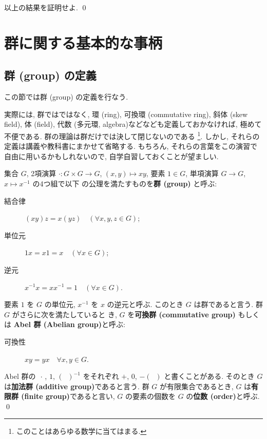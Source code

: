 \documentclass[12pt,twoside]{jarticle}
\begin{document}
\begin{question}
  以上の結果を証明せよ. \qed
\end{question}


\section{群に関する基本的な事柄}
\label{sec:fund-groups}

\subsection{群 (group) の定義}
\label{ss:group-def}

この節では群 (group) の定義を行なう.

実際には, 群ではではなく, 環 (ring), 可換環 (commutative ring), 斜体 (skew
field), 体 (field), 代数 (多元環, algebra)などなども定義しておかなければ, 
極めて不便である. 群の理論は群だけでは決して閉じないのである%
\footnote{このことはあらゆる数学に当てはまる.}.
しかし, それらの定義は講義や教科書にまかせて省略する.
もちろん, それらの言葉をこの演習で自由に用いるかもしれないので, 
自学自習しておくことが望ましい.

\begin{Definition}[群 (group)]
  集合 $G$, 2項演算 $\cdot:G\times G\to G$, $(x,y)\mapsto xy$, 要素 $1\in G$, 
  単項演算 $G\to G$, $x\mapsto x^{-1}$ の4つ組で以下
  の公理を満たすものを{\bf 群 (group)} と呼ぶ:
  \begin{description}
  \item[結合律] $(xy)z = x(yz)\quad (\forall x,y,z\in G)$;
  \item[単位元] $1x = x1 = x\quad (\forall x\in G)$;
  \item[逆元] $x^{-1}x = xx^{-1} = 1\quad (\forall x\in G)$.
  \end{description}
  要素 $1$ を $G$ の単位元, $x^{-1}$ を $x$ の逆元と呼ぶ. 
  このとき $G$ は群であると言う. 群 $G$ がさらに次を満たしていると
  き, $G$ を{\bf 可換群 (commutative group)}
  もしくは {\bf Abel 群 (Abelian group)}と呼ぶ:
  \begin{description}
  \item[可換性] $xy = yx\quad \forall x,y\in G$.
  \end{description}
  Abel 群の $\,\cdot\,$, $1$, $(\;\;)^{-1}$ をそれぞれ %
  $+$, $0$, $-(\;\;)$ と書くことがある. 
  そのとき $G$ は{\bf 加法群 (additive group)}であると言う.
  群 $G$ が有限集合であるとき, $G$ は{\bf 有限群 (finite group)}であると言い, 
  $G$ の要素の個数を $G$ の{\bf 位数 (order)}と呼ぶ.
  \qed
\end{Definition}
\end{document}
